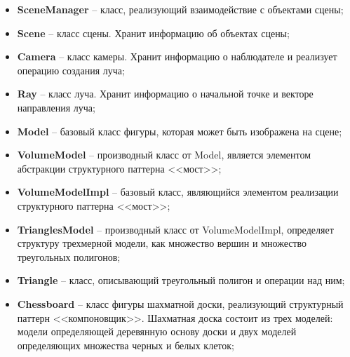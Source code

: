\FloatBarrier
{}
\FloatBarrier

\begin{itemize}
	\item \textbf{SceneManager} -- класс, реализующий взаимодействие с объектами сцены;
	\item \textbf{Scene} -- класс сцены. Хранит информацию об объектах сцены;
	\item \textbf{Camera} -- класс камеры. Хранит информацию о наблюдателе и реализует операцию создания луча;
	\item \textbf{Ray} -- класс луча. Хранит информацию о начальной точке и векторе направления луча;
	\item \textbf{Model} -- базовый класс фигуры, которая может быть изображена на сцене;
	\item \textbf{VolumeModel} -- производный класс от Model, является элементом абстракции структурного паттерна <<мост>>;
	\item \textbf{VolumeModelImpl} -- базовый класс, являющийся элементом реализации структурного паттерна <<мост>>;
	\item \textbf{TrianglesModel} -- производный класс от VolumeModelImpl, определяет структуру трехмерной модели, как множество вершин и множество треугольных полигонов;
	\item \textbf{Triangle} -- класс, описывающий треугольный полигон и операции над ним;
	\item \textbf{Chessboard} -- класс фигуры шахматной доски, реализующий структурный паттерн <<компоновщик>>. Шахматная доска состоит из трех моделей: модели определяющей деревянную основу доски и двух моделей определяющих множества черных и белых клеток;
\end{itemize}

\FloatBarrier
{}
\FloatBarrier

